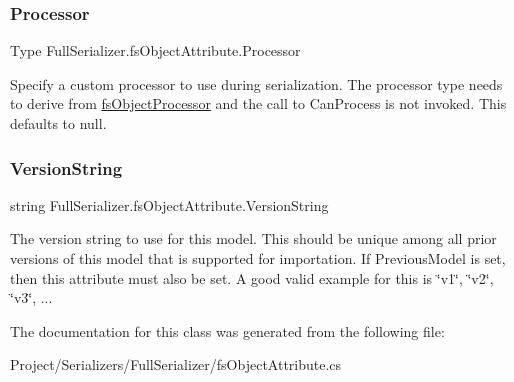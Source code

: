 \mbox{\label{class_full_serializer_1_1fs_object_attribute_a2f71f5d718abe0eb30544ff6f8510664}} 
\subsubsection{\texorpdfstring{Processor}{Processor}}
{\footnotesize\ttfamily Type Full\+Serializer.\+fs\+Object\+Attribute.\+Processor}



Specify a custom processor to use during serialization. The processor type needs to derive from \hyperlink{class_full_serializer_1_1fs_object_processor}{fs\+Object\+Processor} and the call to Can\+Process is not invoked. This defaults to null. 

\mbox{\label{class_full_serializer_1_1fs_object_attribute_ac3208d9844485e25429cd4182d34111a}} 
\subsubsection{\texorpdfstring{Version\+String}{VersionString}}
{\footnotesize\ttfamily string Full\+Serializer.\+fs\+Object\+Attribute.\+Version\+String}



The version string to use for this model. This should be unique among all prior versions of this model that is supported for importation. If Previous\+Model is set, then this attribute must also be set. A good valid example for this is \char`\"{}v1\char`\"{}, \char`\"{}v2\char`\"{}, \char`\"{}v3\char`\"{}, ... 



The documentation for this class was generated from the following file\+:\begin{DoxyCompactItemize}
\item 
Project/\+Serializers/\+Full\+Serializer/fs\+Object\+Attribute.\+cs\end{DoxyCompactItemize}
